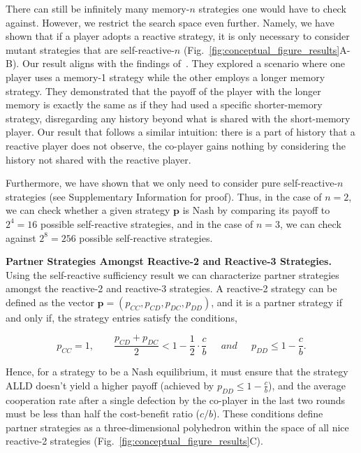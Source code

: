 \documentclass[11pt]{article}
\begin{document}
There can still be infinitely many memory-$n$ strategies one would have to check
against. However, we restrict the search space even further. Namely, we have
shown that if a player adopts a reactive strategy, it is only necessary to
consider mutant strategies that are self-reactive-$n$
(Fig.~\ref{fig:conceptual_figure_results}A-B). Our result aligns with the findings
of~\cite{press:PNAS:2012}. They explored a scenario where one player uses a
memory-1 strategy while the other employs a longer memory strategy. They
demonstrated that the payoff of the player with the longer memory is exactly the
same as if they had used a specific shorter-memory strategy, disregarding any
history beyond what is shared with the short-memory player. Our result that
follows a similar intuition: there is a part of history that a reactive player
does not observe, the co-player gains nothing by considering the history not
shared with the reactive player.


Furthermore, we have shown that we only need to consider pure self-reactive-$n$
strategies (see Supplementary Information for proof). Thus, in the case of $n =
2$, we can check whether a given strategy $\mathbf{p}$ is Nash by comparing its
payoff to $2^4 = 16$ possible self-reactive strategies, and in the case of $n =
3$, we can check against $2^8 = 256$ possible self-reactive strategies.

\textbf{Partner Strategies Amongst Reactive-2 and Reactive-3 Strategies.}
Using the self-reactive sufficiency result we can characterize partner
strategies amongst the reactive-2 and reactive-3 strategies. A reactive-2
strategy can be defined as the vector $\mathbf{p} = (p_{CC}, p_{CD}, p_{DC},
p_{DD})$, and it is a partner strategy if and only if, the strategy entries
satisfy the conditions,

\begin{equation}\label{eq:two_bit_conditions}
  p_{CC} = 1, \qquad \displaystyle \frac{p_{CD} + p_{DC}}{2} < 1 - \frac{1}{2} \cdot \frac{c}{b} \quad ~~and~~ \quad \displaystyle p_{DD} \leq 1\!-\! \frac{c}{b}.
\end{equation}

Hence, for a strategy to be a Nash equilibrium, it must ensure that the strategy
ALLD doesn't yield a higher payoff (achieved by $p_{DD} \leq 1 - \frac{c}{b}$),
and the average cooperation rate after a single defection by the co-player in
the last two rounds must be less than half the cost-benefit ratio ($c/b$). These
conditions define partner strategies as a three-dimensional polyhedron within
the space of all nice reactive-2 strategies
(Fig.~\ref{fig:conceptual_figure_results}C).
\end{document}
